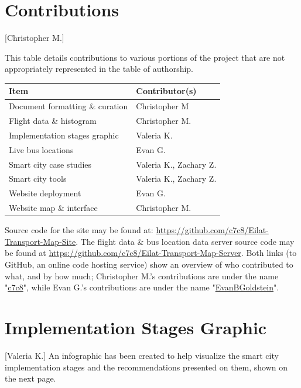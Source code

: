 \documentclass[12pt]{article}                               %
\begin{document}
\begin{appendices}
\section{Contributions}[Christopher M.]

This table details contributions to various portions of the project that are not appropriately represented in the table of authorship.

\begin{table}[H]
    \centering
    \begin{tabular}{l|l}
        \textbf{Item} & \textbf{Contributor(s)} \\
        \hline{}Document formatting \& curation & Christopher M \\
        Flight data \& histogram                & Christopher M. \\
        Implementation stages graphic           & Valeria K. \\
        Live bus locations                      & Evan G. \\
        Smart city case studies                 & Valeria K., Zachary Z. \\
        Smart city tools                        & Valeria K., Zachary Z. \\
        Website deployment                      & Evan G. \\
        Website map \& interface                & Christopher M.
    \end{tabular}
\end{table}

Source code for the site may be found at: \url{https://github.com/c7c8/Eilat-Transport-Map-Site}. The flight data \& bus location data server source code may be found at \url{https://github.com/c7c8/Eilat-Transport-Map-Server}. Both links (to GitHub, an online code hosting service) show an overview of who contributed to what, and by how much; Christopher M.'s contributions are under the name "\href{https://github.com/c7c8}{c7c8}", while Evan G.'s contributions are under the name "\href{https://github.com/EvanBGoldstein}{EvanBGoldstein}".

\section{Implementation Stages Graphic}[Valeria K.] \label{img:stages_graphic}
An infographic has been created to help visualize the smart city implementation stages and the recommendations presented on them, shown on the next page.

 


\end{appendices}
\end{document}

